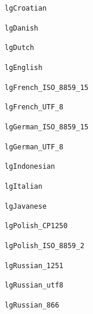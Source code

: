 \documentclass{report}
\begin{document}
\begin{list}{}
\begin{description}
\item[\texttt{lgCroatian}] \label{PasDoc_Languages-lgCroatian}
\index{}
 
\item[\texttt{lgDanish}] \label{PasDoc_Languages-lgDanish}
\index{}
 
\item[\texttt{lgDutch}] \label{PasDoc_Languages-lgDutch}
\index{}
 
\item[\texttt{lgEnglish}] \label{PasDoc_Languages-lgEnglish}
\index{}
 
\item[\texttt{lgFrench{\_}ISO{\_}8859{\_}15}] \label{PasDoc_Languages-lgFrench_ISO_8859_15}
\index{}
 
\item[\texttt{lgFrench{\_}UTF{\_}8}] \label{PasDoc_Languages-lgFrench_UTF_8}
\index{}
 
\item[\texttt{lgGerman{\_}ISO{\_}8859{\_}15}] \label{PasDoc_Languages-lgGerman_ISO_8859_15}
\index{}
 
\item[\texttt{lgGerman{\_}UTF{\_}8}] \label{PasDoc_Languages-lgGerman_UTF_8}
\index{}
 
\item[\texttt{lgIndonesian}] \label{PasDoc_Languages-lgIndonesian}
\index{}
 
\item[\texttt{lgItalian}] \label{PasDoc_Languages-lgItalian}
\index{}
 
\item[\texttt{lgJavanese}] \label{PasDoc_Languages-lgJavanese}
\index{}
 
\item[\texttt{lgPolish{\_}CP1250}] \label{PasDoc_Languages-lgPolish_CP1250}
\index{}
 
\item[\texttt{lgPolish{\_}ISO{\_}8859{\_}2}] \label{PasDoc_Languages-lgPolish_ISO_8859_2}
\index{}
 
\item[\texttt{lgRussian{\_}1251}] \label{PasDoc_Languages-lgRussian_1251}
\index{}
 
\item[\texttt{lgRussian{\_}utf8}] \label{PasDoc_Languages-lgRussian_utf8}
\index{}
 
\item[\texttt{lgRussian{\_}866}] \label{PasDoc_Languages-lgRussian_866}
\index{}
 

\end{description}
\end{list}
\end{document}
